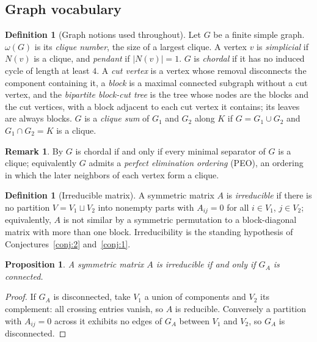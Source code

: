\documentclass[11pt]{article}
\theoremstyle{plain}
\newtheorem{proposition}[theorem]{Proposition}
\theoremstyle{definition}
\newtheorem{definition}[theorem]{Definition}
\newtheorem{remark}[theorem]{Remark}
\begin{document}
\begin{aiblock}
\subsection{Graph vocabulary}

\begin{definition}[Graph notions used throughout]\label{def:graphvocab}
Let $G$ be a finite simple graph. $\omega(G)$ is its \emph{clique number}, the size of a largest
clique. A vertex $v$ is \emph{simplicial} if $N(v)$ is a clique, and \emph{pendant} if
$|N(v)|=1$. $G$ is \emph{chordal} if it has no induced cycle of length at least $4$. A \emph{cut vertex} is a vertex whose removal disconnects the component containing it,
a \emph{block} is a maximal connected subgraph without a cut vertex, and the \emph{bipartite
block-cut tree} is the tree whose nodes are the blocks and the cut vertices, with a block adjacent to
each cut vertex it contains; its leaves are always blocks. $G$ is a \emph{clique sum} of $G_1$ and
$G_2$ along $K$ if $G=G_1\cup G_2$ and $G_1\cap G_2=K$ is a clique.
\end{definition}

\begin{remark}
By \cite{Dirac} $G$ is chordal if and only if every minimal separator of $G$ is a clique; equivalently \cite{Fulkerson} $G$ admits a
\emph{perfect elimination ordering} (PEO), an ordering in which the later neighbors of each vertex
form a clique.
\end{remark}

\begin{definition}[Irreducible matrix]\label{def:irred}
A symmetric matrix $A$ is \emph{irreducible} if there is no partition $V=V_1\sqcup V_2$ into nonempty
parts with $A_{ij}=0$ for all $i\in V_1$, $j\in V_2$; equivalently, $A$ is not similar by a symmetric
permutation to a block-diagonal matrix with more than one block. Irreducibility is the standing
hypothesis of Conjectures~\ref{conj:2} and~\ref{conj:1}.
\end{definition}

\begin{proposition}\label{prop:irred-connected}
A symmetric matrix $A$ is irreducible if and only if $G_A$ is connected.
\end{proposition}
\begin{proof}
If $G_A$ is disconnected, take $V_1$ a union of components and $V_2$ its complement: all crossing
entries vanish, so $A$ is reducible. Conversely a partition with $A_{ij}=0$ across it exhibits no
edges of $G_A$ between $V_1$ and $V_2$, so $G_A$ is disconnected.
\end{proof}


\end{aiblock}
\end{document}
